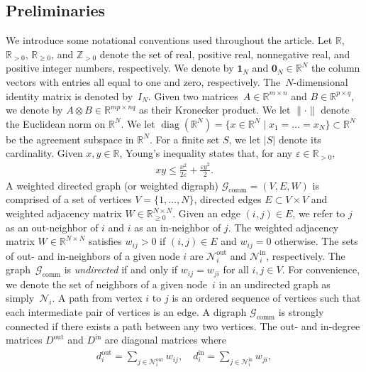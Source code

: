 \documentclass{autart}
\newcommand{\real}{{\mathbb{R}}}
\newcommand{\realpositive}{\mathbb{R}_{>0}}
\newcommand{\realnonnegative}{\mathbb{R}_{\ge 0}}
\newcommand{\integerpositive}{\mathbb{Z}_{> 0}}
\newcommand{\GG}{{\mathcal{G}}}
\newcommand{\NN}{{\mathcal{N}}}
\newcommand{\douti}{d_i^{\operatorname{out}}}
\newcommand{\Nouti}{\mathcal{N}_i^{\operatorname{out}}}
\newcommand{\Nini}{\mathcal{N}_i^{\operatorname{in}}}
\newcommand{\Dout}{D^{\operatorname{out}}}
\newcommand{\Din}{D^{\operatorname{in}}}
\newcommand{\ones}[1]{\mathbf{1}_{#1}}
\newcommand{\zeros}[1]{\mathbf{0}_{#1}}
\newcommand{\diag}[1]{\operatorname{diag}\left( #1\right)}
\newcommand{\vertices}{V}
\renewcommand{\epsilon}{\varepsilon}
\newcommand{\until}[1]{\{1,\dots, #1\}}
\newcommand{\Norm}[1]{\|#1\|}
\newcommand{\setdef}[2]{\{#1 \; | \; #2\}}
\newcommand{\commgraph}{\GG_\text{comm}}
\begin{document}
\subsection*{Preliminaries}

We introduce some notational conventions used throughout the
article. Let $\real$, $\realpositive$, $\realnonnegative$, and
$\integerpositive$ denote the set of real, positive real, nonnegative
real, and positive integer numbers, respectively. We denote by
$\ones{N}$ and $\zeros{N} \in \real^N$ the column vectors with entries
all equal to one and zero, respectively. The~$N$-dimensional identity
matrix is denoted by~$I_N$. Given two
matrices~$A \in \real^{m \times n}$ and $B \in \real^{p \times q}$, we
denote by $A \otimes B \in \real^{mp \times nq}$ as their Kronecker
product. We let $\Norm{\cdot}$ denote the Euclidean norm on
$\real^N$. We let
$\diag{\real^N} = \setdef{x \in \real^N}{x_1=\dots=x_N} \subset
\real^N$
be the agreement subspace in $\real^N$.  For a finite set $S$, we let
$|S|$ denote its cardinality. Given $x, y \in \real$, Young's
inequality states that, for any $\epsilon \in \realpositive$,
\begin{align}\label{eq:Young}
  xy \leq \frac{x^2}{2\epsilon} + \frac{ \epsilon y^2}{2}.
\end{align}
A weighted directed graph (or weighted digraph) $\commgraph = (V,E,W)$
is comprised of a set of vertices $V = \until{N}$, directed edges
$E \subset V \times V$ and weighted adjacency matrix
$W \in \realnonnegative^{N \times N}$. Given an edge $(i,j) \in E$, we
refer to $j$ as an out-neighbor of $i$ and $i$ as an in-neighbor of
$j$.  The weighted adjacency matrix $W \in \real^{N \times N}$
satisfies $w_{ij} > 0$ if $(i, j) \in E$ and $w_{ij} = 0$
otherwise. The sets of out- and in-neighbors of a given node $i$ are
$\Nouti$ and $\Nini$, respectively. The graph~$\commgraph$ is
\emph{undirected} if and only if $w_{ij} = w_{ji}$ for all
$i,j \in \vertices$. For convenience, we denote the set of neighbors
of a given node~$i$ in an undirected graph as simply~$\NN_i$.  A path
from vertex $i$ to $j$ is an ordered sequence of vertices such that
each intermediate pair of vertices is an edge.  A digraph $\commgraph$
is strongly connected if there exists a path between any two vertices.
The out- and in-degree matrices $\Dout$ and $\Din$ are diagonal
matrices where
\begin{align*}
  \douti = \sum_{j \in \Nouti} w_{ij} , \quad d_i^{\operatorname{in}} =
  \sum_{j \in \Nini} w_{ji} ,
\end{align*}
\end{document}
